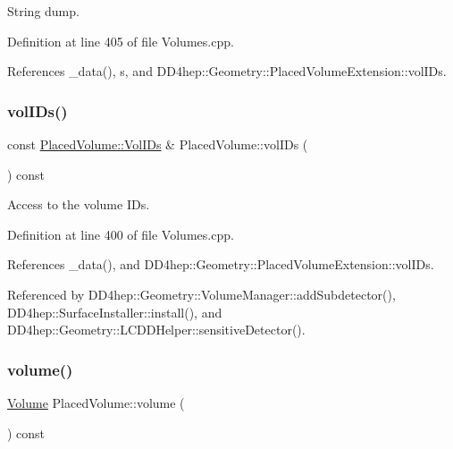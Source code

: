 String dump. 



Definition at line 405 of file Volumes.\+cpp.



References \+\_\+data(), s, and D\+D4hep\+::\+Geometry\+::\+Placed\+Volume\+Extension\+::vol\+I\+Ds.

\hypertarget{class_d_d4hep_1_1_geometry_1_1_placed_volume_a302037d5e140c5b832ba8057466d8214}{}\label{class_d_d4hep_1_1_geometry_1_1_placed_volume_a302037d5e140c5b832ba8057466d8214} 
\subsubsection{\texorpdfstring{vol\+I\+Ds()}{volIDs()}}
{\footnotesize\ttfamily const \hyperlink{class_d_d4hep_1_1_geometry_1_1_placed_volume_a4383991fbc94adc2997ef98c9d30d9a6}{Placed\+Volume\+::\+Vol\+I\+Ds} \& Placed\+Volume\+::vol\+I\+Ds (\begin{DoxyParamCaption}{ }\end{DoxyParamCaption}) const}



Access to the volume I\+Ds. 



Definition at line 400 of file Volumes.\+cpp.



References \+\_\+data(), and D\+D4hep\+::\+Geometry\+::\+Placed\+Volume\+Extension\+::vol\+I\+Ds.



Referenced by D\+D4hep\+::\+Geometry\+::\+Volume\+Manager\+::add\+Subdetector(), D\+D4hep\+::\+Surface\+Installer\+::install(), and D\+D4hep\+::\+Geometry\+::\+L\+C\+D\+D\+Helper\+::sensitive\+Detector().

\hypertarget{class_d_d4hep_1_1_geometry_1_1_placed_volume_a13113feba33041cee2738730ab70a9fc}{}\label{class_d_d4hep_1_1_geometry_1_1_placed_volume_a13113feba33041cee2738730ab70a9fc} 
\subsubsection{\texorpdfstring{volume()}{volume()}}
{\footnotesize\ttfamily \hyperlink{class_d_d4hep_1_1_geometry_1_1_volume}{Volume} Placed\+Volume\+::volume (\begin{DoxyParamCaption}{ }\end{DoxyParamCaption}) const}



